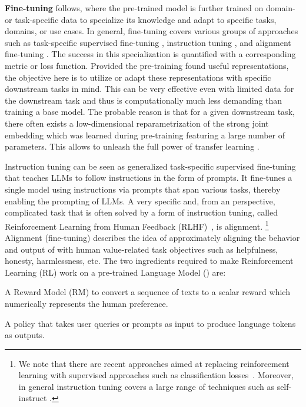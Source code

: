 \documentclass[10pt]{article} %
\begin{document}
\textbf{Fine-tuning} follows, where the pre-trained model is further trained on domain- or task-specific data to specialize its knowledge and adapt to specific tasks,  domains, or use cases. In general, fine-tuning covers various groups of approaches such as task-specific supervised fine-tuning \citep{zhao-arxiv23a}, instruction tuning \citep{wei-iclr22a}, and alignment fine-tuning \citep{zhao-arxiv23a}. 
The success in this specialization is quantified with a corresponding metric or loss function. 
Provided the pre-training found useful representations, the objective here is to utilize or adapt these representations with specific downstream tasks in mind.
This can be very effective even with limited data for the downstream task and thus is computationally much less demanding than training a base model.
The probable reason is that for a given downstream task, there often exists a low-dimensional reparametrization of the strong joint embedding which was learned during pre-training featuring a large number of parameters. This allows to unleash the full power of transfer learning \citep{aghajanyan-acl21}.

Instruction tuning can be seen as generalized task-specific supervised fine-tuning that teaches LLMs to follow instructions in the form of prompts. It fine-tunes a single model using instructions via prompts that span various tasks, thereby enabling the prompting of LLMs. A very specific and, from an \AutoML perspective, complicated task that is often solved by a form of instruction tuning, called Reinforcement Learning from Human Feedback (RLHF)~\citep{fernandes-arxiv23a}, is alignment.%
\footnote{We note that there are recent approaches aimed at replacing reinforcement learning with supervised approaches such as classification losses~\citep{rafailov-arxiv23a}. Moreover, in general instruction tuning covers a large range of techniques such as self-instruct \citep{wang-acl23a}.}
Alignment (fine-tuning) describes the idea of approximately aligning the behavior and output of \LLMs with human value-related task objectives such as helpfulness, honesty, harmlessness, etc.
The two ingredients required to make Reinforcement Learning (RL) work on a pre-trained Language Model (\LM) are:
\begin{inparaenum}[(i)]
    \item A Reward Model (RM) to convert a sequence of texts to a scalar reward which numerically represents the human preference.
    \item A policy that takes user queries or prompts as input to produce language tokens as outputs.
\end{inparaenum}
\end{document}
